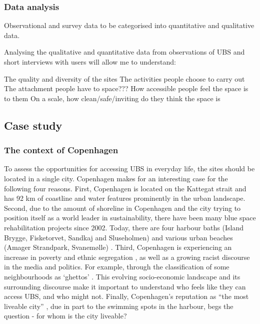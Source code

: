 \documentclass{article}
\begin{document}
\subsubsection{Data analysis}

Observational and survey data to be categorised into quantitative and qualitative data.

Analysing the qualitative and quantitative data from observations of UBS and short interviews with users will allow me to understand:

\begin{outline}
	\1 The quality and diversity of the sites
	\1 The activities people choose to carry out
	\1 The attachment people have to space??? 
	\1 How accessible people feel the space is to them
	\1 On a scale, how clean/safe/inviting do they think the space is
\end{outline}

\subsection{Case study}

\subsubsection{The context of Copenhagen}

To assess the opportunities for accessing UBS in everyday life, the sites should be located in a single city. Copenhagen makes for an interesting case for the following four reasons. First, Copenhagen is located on the Kattegat strait and has 92 km of coastline \parencite{Comertler2017} and water features prominently in the urban landscape. Second, due to the amount of shoreline in Copenhagen and the city trying to position itself as a world leader in sustainability, there have been many blue space rehabilitation projects since 2002. Today, there are four harbour baths (Island Brygge, Fisketorvet, Sandkaj and Sluseholmen) and various urban beaches (Amager Strandpark, Svanemølle) \parencite{visitcopenhagen_baths}. Third, Copenhagen is experiencing an increase in poverty and ethnic segregation \parencite{moller2015socioeconomic}, as well as a growing racist discourse in the media and politics. For example, through the classification of some neighbourhoods as ‘ghettos’ \parencite{simonsen2008practice}. This evolving socio-economic landscape and its surrounding discourse make it important to understand who feels like they can access UBS, and who might not. Finally, Copenhagen’s reputation as “the most liveable city” \parencite{visitdenmark_2021}, due in part to the swimming spots in the harbour, begs the question - for whom is the city liveable?
\end{document}
